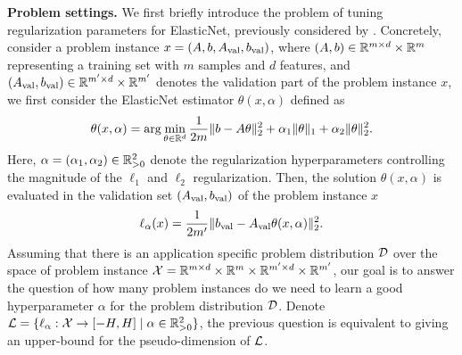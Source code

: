 \textbf{Problem settings.} We first briefly introduce the problem of tuning regularization parameters for ElasticNet, previously considered by \citet{balcan2023new}. Concretely, consider a problem instance $x = (A, b, A_\textup{val}, b_\textup{val})$, where $(A, b) \in \mathbb{R}^{m \times d} \times \mathbb{R}^m$ representing a training set with $m$ samples and $d$ features, and $(A_\textup{val}, b_\textup{val}) \in \mathbb{R}^{m' \times d} \times \mathbb{R}^{m'}$ denotes the validation part of the problem instance $x$, we first consider the ElasticNet estimator $\theta(x, \alpha)$ defined as
\[
    \theta(x, \alpha) = \arg\min_{\theta \in \mathbb{R}^d} \frac{1}{2m} \|b - A\theta\|_2^2 + \alpha_1 \|\theta\|_1 + \alpha_2 \|\theta\|_2^2.
\]
Here, $\alpha = (\alpha_1, \alpha_2) \in \mathbb{R}^2_{> 0}$ denote the regularization hyperparameters controlling the magnitude of the $\ell_1$ and $\ell_2$ regularization. Then, the solution $\theta(x, \alpha)$ is evaluated in the validation set $(A_\textup{val}, b_\textup{val})$ of the problem instance $x$
\[  
    \ell_\alpha(x) = \frac{1}{2m'}\|b_\textup{val} - A_\textup{val} \theta(x, \alpha)\|_2^2. 
\]
Assuming that there is an application specific problem distribution $\mathcal{D}$ over the space of problem instance $\mathcal{X} = \mathbb{R}^{m \times d} \times \mathbb{R}^m \times \mathbb{R}^{m' \times d} \times \mathbb{R}^{m'}$, our goal is to answer the question of how many problem instances do we need to learn a good hyperparameter $\alpha$ for the problem distribution $\mathcal{D}$. Denote $\mathcal{L} = \{\ell_\alpha: \mathcal{X} \rightarrow [-H, H] \mid \alpha \in \mathbb{R}^2_{>0}\}$, the previous question is equivalent to giving an upper-bound for the pseudo-dimension of $\mathcal{L}$. 

